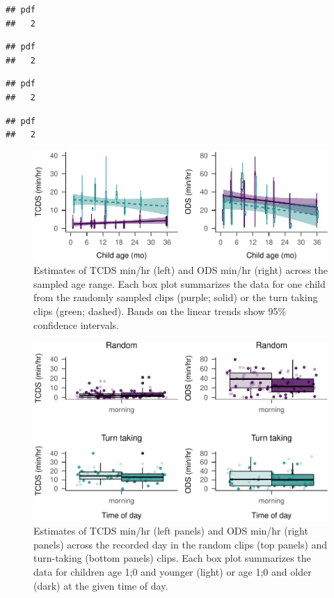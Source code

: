 \documentclass[floatsintext,man]{apa6}
\theoremstyle{definition}
\theoremstyle{definition}
\theoremstyle{definition}
\theoremstyle{remark}
\begin{document}
\begin{verbatim}
## pdf 
##   2
\end{verbatim}

\begin{verbatim}
## pdf 
##   2
\end{verbatim}

\begin{verbatim}
## pdf 
##   2
\end{verbatim}

\begin{verbatim}
## pdf 
##   2
\end{verbatim}

\begin{figure}
\centering
\includegraphics{Yeli-CLE_files/figure-latex/fig3-1.pdf}
\caption{\label{fig:fig3}Estimates of TCDS min/hr (left) and ODS min/hr
(right) across the sampled age range. Each box plot summarizes the data
for one child from the randomly sampled clips (purple; solid) or the
turn taking clips (green; dashed). Bands on the linear trends show 95\%
confidence intervals.}
\end{figure}

\begin{figure}
\centering
\includegraphics{Yeli-CLE_files/figure-latex/fig5-1.pdf}
\caption{\label{fig:fig5}Estimates of TCDS min/hr (left panels) and ODS
min/hr (right panels) across the recorded day in the random clips (top
panels) and turn-taking (bottom panels) clips. Each box plot summarizes
the data for children age 1;0 and younger (light) or age 1;0 and older
(dark) at the given time of day.}
\end{figure}
\end{document}
